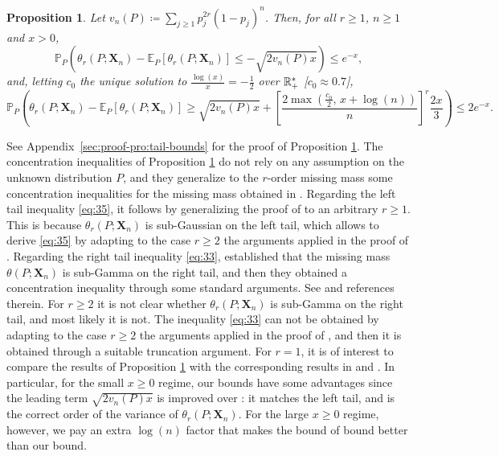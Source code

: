 \documentclass{article}
\newtheorem{proposition}{Proposition}
\newcommand{\1}{\boldsymbol{1}}
\newcommand{\EE}{\mathbb{E}}
\newcommand{\PP}{\mathbb{P}}
\theoremstyle{plain}
\begin{document}
\begin{proposition}\label{pro:7}
  Let $v_n(P) \coloneqq \sum_{j\geq 1}p_j^{2r}(1-p_j)^n$. Then, for all $r \geq 1$, $n\geq 1$ and $x > 0$,
  \begin{equation}
    \label{eq:35}
    \PP_P\left( \theta_r(P;\mathbf{X}_n) - \EE_P[\theta_r(P;\mathbf{X}_n)] \leq - \sqrt{2v_n(P)x} \right)%
    \leq e^{-x},
  \end{equation}
  and, letting $c_0$ the unique solution to $\frac{\log(x)}{x} = -\frac{1}{2}$ over $\mathbb{R}_{+}^{*}$ [$c_0 \approx 0.7$],
  \begin{equation}
    \label{eq:33}
    \PP_P\left( \theta_r(P;\mathbf{X}_n) - \EE_P[\theta_r(P;\mathbf{X}_n)] \geq \sqrt{2v_n(P)x} + \left[\frac{2\max(\frac{c_0}{2},\, x + \log(n))}{n} \right]^r \frac{2x}{3} \right)%
    \leq%
    2e^{-x}.
  \end{equation}
\end{proposition}

See Appendix~\ref{sec:proof-pro:tail-bounds} for the proof of Proposition \ref{pro:7}. The concentration inequalities of Proposition \ref{pro:7} do not rely on any assumption on the unknown distribution $P$, and they generalize to the $r$-order missing mass some concentration inequalities for the missing mass obtained in \cite{McA(03),Oha(12),Ben(17)}.  Regarding the left tail inequality \eqref{eq:35}, it follows by generalizing the proof of \cite[Proposition 3.7]{Ben(17)} to an arbitrary $r\geq1$. This is because $\theta_r(P;\mathbf{X}_n)$ is sub-Gaussian on the left tail, which allows to derive \eqref{eq:35} by adapting to the case $r\geq2$ the arguments applied in the proof of \cite[Proposition 3.7]{Ben(17)}. Regarding the right tail inequality \eqref{eq:33}, \cite[Theorem 3.9]{Ben(17)} established that the missing mass $\theta(P;\mathbf{X}_n)$ is sub-Gamma on the right tail, and then they obtained a concentration inequality through some standard arguments. See \cite[Chapter 2 and Chapter 3]{BLM(13)} and references therein. For $r \geq 2$ it is not clear whether $\theta_r(P;\mathbf{X}_n)$ is sub-Gamma on the right tail, and most likely it is not. The inequality \eqref{eq:33} can not be obtained by adapting to the case $r\geq2$ the arguments applied in the proof of \cite[Theorem 3.9]{Ben(17)}, and then it is obtained through a suitable truncation argument. For $r=1$, it is of interest to compare the results of Proposition \ref{pro:7} with the corresponding results in \cite[Proposition 3.7]{Ben(17)} and \cite[Theorem 3.9]{Ben(17)}. In particular, for the small $x \geq 0$ regime, our bounds have some advantages since the leading term $\sqrt{2v_n(P)x}$ is improved over \cite{Ben(17)}: it matches the left tail, and is the correct order of the variance of $\theta_r(P;\mathbf{X}_n)$. For the large $x \geq 0$ regime, however, we pay an extra $\log(n)$ factor that makes the bound of \cite{Ben(17)} bound better than our bound.
\end{document}
